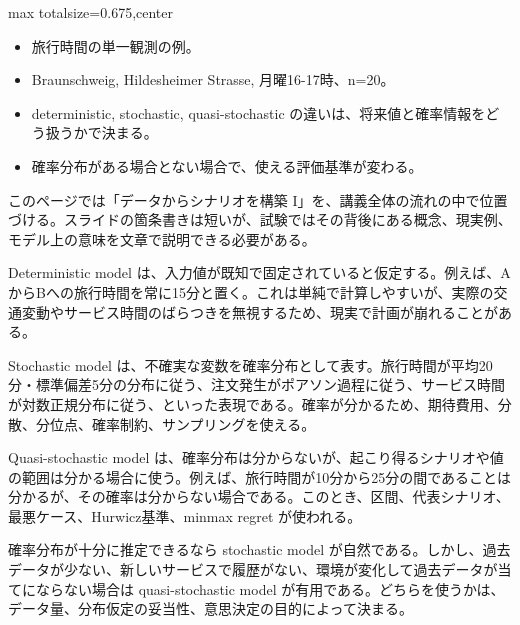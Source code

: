 \clearpage
{}
\begin{adjustbox}{max totalsize={\textwidth}{0.675\textheight},center}
\begin{minipage}{\textwidth}\scriptsize
\begin{minipage}[t]{0.485\textwidth}
\begin{itemize}
\item 旅行時間の単一観測の例。
\item Braunschweig, Hildesheimer Strasse, 月曜16-17時、n=20。
\end{itemize}
\begin{itemize}
\item deterministic, stochastic, quasi-stochastic の違いは、将来値と確率情報をどう扱うかで決まる。
\item 確率分布がある場合とない場合で、使える評価基準が変わる。
\end{itemize}
\end{minipage}\hfill
\begin{minipage}[t]{0.485\textwidth}
このページでは「データからシナリオを構築 I」を、講義全体の流れの中で位置づける。スライドの箇条書きは短いが、試験ではその背後にある概念、現実例、モデル上の意味を文章で説明できる必要がある。\par
Deterministic model は、入力値が既知で固定されていると仮定する。例えば、AからBへの旅行時間を常に15分と置く。これは単純で計算しやすいが、実際の交通変動やサービス時間のばらつきを無視するため、現実で計画が崩れることがある。\par
Stochastic model は、不確実な変数を確率分布として表す。旅行時間が平均20分・標準偏差5分の分布に従う、注文発生がポアソン過程に従う、サービス時間が対数正規分布に従う、といった表現である。確率が分かるため、期待費用、分散、分位点、確率制約、サンプリングを使える。\par
Quasi-stochastic model は、確率分布は分からないが、起こり得るシナリオや値の範囲は分かる場合に使う。例えば、旅行時間が10分から25分の間であることは分かるが、その確率は分からない場合である。このとき、区間、代表シナリオ、最悪ケース、Hurwicz基準、minmax regret が使われる。\par
確率分布が十分に推定できるなら stochastic model が自然である。しかし、過去データが少ない、新しいサービスで履歴がない、環境が変化して過去データが当てにならない場合は quasi-stochastic model が有用である。どちらを使うかは、データ量、分布仮定の妥当性、意思決定の目的によって決まる。\par

\end{minipage}
\end{minipage}
\end{adjustbox}
